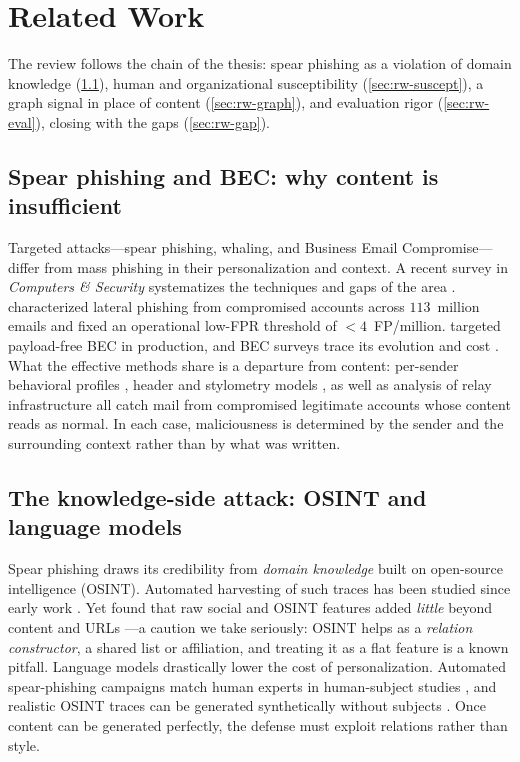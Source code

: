 \section{Related Work}
\label{sec:related}

The review follows the chain of the thesis: spear phishing as a violation of domain knowledge
(\ref{sec:rw-spear}), human and organizational susceptibility (\ref{sec:rw-suscept}), a graph signal in place of
content (\ref{sec:rw-graph}), and evaluation rigor (\ref{sec:rw-eval}), closing with the gaps (\ref{sec:rw-gap}).

\subsection{Spear phishing and BEC: why content is insufficient}
\label{sec:rw-spear}
Targeted attacks---spear phishing, whaling, and Business Email Compromise---differ from mass phishing in their personalization and context.
A recent survey in \emph{Computers \& Security} systematizes the techniques and gaps
of the area \citep{birthriya2025detection}. \citet{ho2019detecting} characterized lateral phishing from
compromised accounts across $113$~million emails and fixed an operational low-FPR threshold of $<\!4$~FP/million.
\citet{cidon2019high} targeted payload-free BEC in production, and BEC surveys trace its evolution and cost
\citep{atlam2023business}. What the effective methods share is a departure from content: per-sender behavioral
profiles \citep{gascon2018reading,stringhini2015thataint}, header and stylometry models
\citep{duman2016emailprofiler}, as well as analysis of relay infrastructure \citep{luo2024characterizing} all catch mail
from compromised legitimate accounts whose content reads as normal. In each case, maliciousness
is determined by the sender and the surrounding context rather than by what was written.

\subsection{The knowledge-side attack: OSINT and language models}
\label{sec:rw-attack}
Spear phishing draws its credibility from \emph{domain knowledge} built on open-source intelligence (OSINT).
Automated harvesting of such traces has been studied since early work \citep{edwards2017panning}. Yet \citet{dewan2014analyzing}
found that raw social and OSINT features added \emph{little} beyond content and URLs
\citep{dewan2014analyzing,dewan2017facebook}---a caution we take seriously: OSINT helps as a \emph{relation
constructor}, a shared list or affiliation, and treating it as a flat feature is a known pitfall. Language models drastically lower the
cost of personalization. Automated spear-phishing campaigns match human experts in human-subject studies
\citep{bethany2024evaluating}, and realistic OSINT traces can be generated synthetically without subjects
\citep{brown2025web}. Once content can be
generated perfectly, the defense must exploit relations rather than style.

